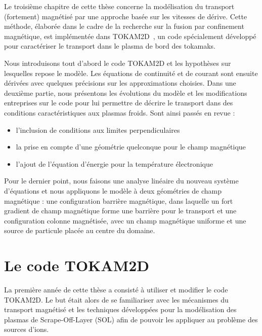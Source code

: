 \label{chapitre3}
\begin{refsection}
Le troisième chapitre de cette thèse concerne la modélisation du transport
(fortement) magnétisé par une approche basée sur les vitesses de dérive. Cette
méthode, élaborée dans le cadre de la recherche sur la fusion par
confinement magnétique, est implémentée dans TOKAM2D~\cite{Sarazin}, un code 
spécialement développé pour caractériser le transport dans le plasma de bord
des tokamaks.

Nous introduisons tout d'abord le code TOKAM2D et les hypothèses sur
lesquelles repose le modèle. Les équations de continuité et de
courant sont ensuite dérivées avec quelques précisions sur les approximations
choisies.
Dans une deuxième partie, nous présentons les évolutions du
modèle et les modifications entreprises sur le code pour lui
permettre de décrire le transport dans des conditions caractéristiques aux
plasmas froids. Sont ainsi passés en revue :

\begin{itemize}
  \item l'inclusion de conditions aux limites
perpendiculaires
\item la prise en compte d'une géométrie quelconque pour le champ magnétique
\item l'ajout de l'équation d'énergie pour la
température électronique
\end{itemize}

Pour le dernier point, nous faisons une analyse linéaire du nouveau système
d'équations et nous appliquons le modèle à deux géométries de champ
magnétique : une configuration barrière magnétique, dans laquelle un fort
gradient de champ magnétique forme une barrière pour le transport et une
configuration colonne magnétisée, avec un champ magnétique uniforme et une
source de particule placée au centre du domaine.

\section{Le code TOKAM2D}

La première année de cette thèse a consisté à utiliser et modifier le
code {TOKAM2D}. Le but était alors de se familiariser avec les mécanismes du
transport magnétisé et les techniques développées pour la modélisation des
plasmas de Scrape-Off-Layer (SOL) afin
de pouvoir les appliquer au problème des sources d'ions. 


\end{refsection}
